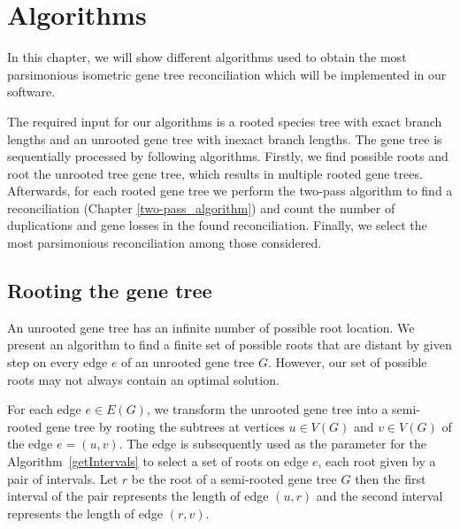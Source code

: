\chapter{Algorithms} \label{Algorithms}

In this chapter, we will show different algorithms used to obtain the most parsimonious isometric gene tree reconciliation which will be implemented in our software. 

The required input for our algorithms is a rooted species tree with exact branch lengths and an unrooted gene tree with inexact branch lengths. The gene tree is sequentially processed by following algorithms. Firstly, we find possible roots and root the unrooted tree gene tree, which results in multiple rooted gene trees. Afterwards, for each rooted gene tree we perform the two-pass algorithm to find a reconciliation  (Chapter \ref{two-pass_algorithm}) and count the number of duplications and gene losses in the found reconciliation. Finally, we select the most parsimonious reconciliation among those considered.

\section{Rooting the gene tree} \label{rooting_the_gene_tree}

An unrooted gene tree has an infinite number of possible root location. We present an algorithm to find a finite set of possible roots that are distant by given step on every edge $e$ of an unrooted gene tree $G$. However, our set of possible roots may not always contain an optimal solution. 

For each edge $e \in E(G)$, we transform the unrooted gene tree into a semi-rooted gene tree by rooting the subtrees at vertices $u \in V(G)$ and $v \in V(G)$ of the edge $e = (u, v)$. The edge is subsequently used as the parameter for the Algorithm~\ref{getIntervals} to select a set of roots on edge $e$, each root given by a pair of intervals. Let $r$ be the root of a semi-rooted gene tree $G$ then the first interval of the pair represents the length of edge $(u, r)$ and the second interval represents the length of edge $(r, v)$.

